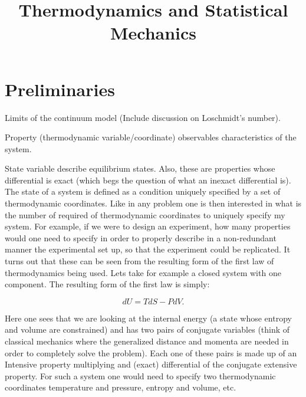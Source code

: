 \documentclass[10pt,twoside,openright]{memoir}
\title{Thermodynamics and Statistical Mechanics}
\date{}
\makeatletter
\def\maketitle{%
  \null
  \thispagestyle{empty}%
  \vfill
  \begin{center}\leavevmode
    \normalfont
    {\LARGE\raggedleft \@author\par}%
    \hrulefill\par
    {\huge\raggedright \@title\par}%
    \vskip 1cm
  \end{center}%
  \vfill
  \null
  \cleardoublepage
  }
\makeatother
\begin{document}
\let\cleardoublepage\clearpage


\maketitle










\renewcommand\cftchapteraftersnumb{\normalfont}
\renewcommand\cftbeforechapterskip{5pt plus 1pt}

\frontmatter
\tableofcontents*


\mainmatter
\sloppy




\chapter{Preliminaries}

Limits of the continuum model (Include discussion on Loschmidt's number).

Property (thermodynamic variable/coordinate) observables characteristics of the system.

State variable describe equilibrium states. Also, these are properties whose differential is exact (which begs the question of what an inexact differential is). 
The state of a system is defined as a condition uniquely specified by a set of thermodynamic coordinates. 
Like in any problem one is then interested in what is the number of required of thermodynamic coordinates to uniquely specify my system.
For example, if we were to design an experiment, how many properties would one need to specify in order to properly describe in a non-redundant manner the experimental set up, so that the experiment could be replicated.
It turns out that these can be seen from the resulting form of the first law of thermodynamics being used.
Lets take for example a closed system with one component. The resulting form of the first law is simply:

\begin{equation}
dU = TdS - PdV.
\end{equation}

Here one sees that we are looking at the internal energy (a state whose entropy and volume are constrained) and has two pairs of conjugate variables (think of classical mechanics where the generalized distance and momenta are needed in order to completely solve the problem). 
Each one of these pairs is made up of an Intensive property multiplying and (exact) differential of the conjugate extensive property. 
For such a system one would need to specify two thermodynamic coordinates temperature and pressure, entropy and volume, etc. 
\end{document}
